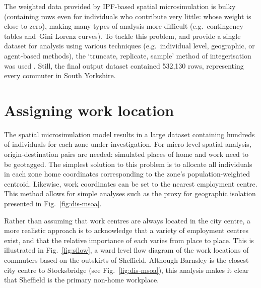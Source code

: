 The weighted data provided by IPF-based spatial microsimulation is bulky
(containing rows even for individuals who contribute very little: whose
weight is close to zero), making many types of analysis more difficult
(e.g.~contingency tables and~Gini Lorenz curves). To tackle
this problem, and provide a single
dataset for analysis using various techniques (e.g.~individual level,
geographic, or agent-based methods), the `truncate, replicate, sample' method
of integerisation was used \citet{Lovelace2013-trs}. Still, the final output
dataset contained 532,130 rows, representing every commuter in South Yorkshire.

\section{Assigning work location}
\label{s:workdes}
The spatial microsimulation model results in a large dataset containing
hundreds of individuals for each zone under investigation. For micro level
spatial analysis, origin-destination pairs are needed: simulated
places of home and work need to be geotagged. The simplest solution
to this problem is to allocate all individuals in each zone home coordinates
corresponding to the zone's population-weighted centroid. Likewise, work coordinates
can be set to the nearest employment centre. This method allows
for simple analyses such as the proxy for geographic
isolation presented in Fig.~\ref{fig:dis-msoa}.

Rather than assuming that work centres are always located in the city
centre, a more realistic approach is to acknowledge that a variety of
employment centres exist, and that the relative importance of each varies from
place to place. This is illustrated in Fig.~\ref{fig:sflow}, a ward level
flow diagram of
the work locations of commuters based on the outskirts of Sheffield. Although
Barnsley is the closest city centre to Stocksbridge (see
Fig.~\ref{fig:dis-msoa}), this analysis makes it clear that Sheffield is the
primary non-home workplace.

